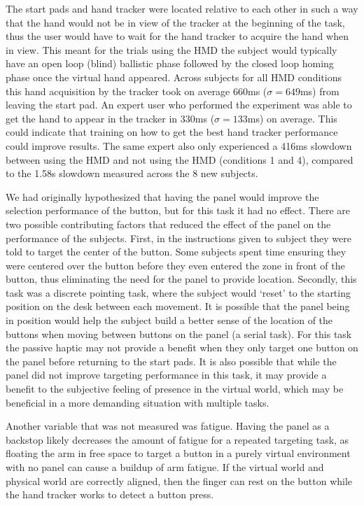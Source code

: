 The start pads and hand tracker were located relative to each other in such a way that the hand would not be in view of the tracker at the beginning of the task, thus the user would have to wait for the hand tracker to acquire the hand when in view.
This meant for the trials using the HMD the subject would typically have an open loop (blind) ballistic phase followed by the closed loop homing phase once the virtual hand appeared.
Across subjects for all HMD conditions this hand acquisition by the tracker took on average 660ms ($\sigma = 649$ms) from leaving the start pad.
An expert user who performed the experiment was able to get the hand to appear in the tracker in 330ms ($\sigma = 133$ms) on average.
This could indicate that training on how to get the best hand tracker performance could improve results.
The same expert also only experienced a 416ms slowdown between using the HMD and not using the HMD (conditions 1 and 4), compared to the 1.58s slowdown measured across the 8 new subjects.

We had originally hypothesized that having the panel would improve the selection performance of the button, but for this task it had no effect.
There are two possible contributing factors that reduced the effect of the panel on the performance of the subjects.
First, in the instructions given to subject they were told to target the center of the button.
Some subjects spent time ensuring they were centered over the button before they even entered the zone in front of the button, thus eliminating the need for the panel to provide location.
Secondly, this task was a discrete pointing task, where the subject would `reset' to the starting position on the desk between each movement.
It is possible that the panel being in position would help the subject build a better sense of the location of the buttons when moving between buttons on the panel (a serial task).
For this task the passive haptic may not provide a benefit when they only target one button on the panel before returning to the start pads.
It is also possible that while the panel did not improve targeting performance in this task, it may provide a benefit to the subjective feeling of presence in the virtual world, which may be beneficial in a more demanding situation with multiple tasks.

Another variable that was not measured was fatigue.
Having the panel as a backstop likely decreases the amount of fatigue for a repeated targeting task, as floating the arm in free space to target a button in a purely virtual environment with no panel can cause a buildup of arm fatigue.
If the virtual world and physical world are correctly aligned, then the finger can rest on the button while the hand tracker works to detect a button press.

